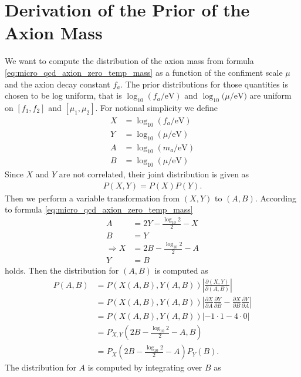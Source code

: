 \documentclass[twoside,a4paper, 12pt]{article}
\numberwithin{equation}{section}
\begin{document}
\section{Derivation of the Prior of the Axion Mass}
\label{sec:axion_mass_prior}
We want to compute the distribution of the axion mass from
formula \eqref{eq:micro_qcd_axion_zero_temp_mass} as a 
function of the confiment scale $\mu$ and the axion decay constant
$f_a$.
The prior distributions for those quantities is chosen
to be log uniform, that is $\log_{10} (f_a / \mathrm{eV})$
and $\log_{10} (\mu / \mathrm{eV)}$ are uniform on
$[f_1, f_2]$ and $[\mu_1, \mu_2]$.
For notional simplicity we define
\begin{align*}
    X &= \log_{10} (f_a / \mathrm{eV}) \\
    Y &= \log_{10} (\mu / \mathrm{eV}) \\
    A &= \log_{10} (m_a / \mathrm{eV}) \\
    B &= \log_{10} (\mu / \mathrm{eV})
\end{align*}
Since $X$ and $Y$ are not correlated, their joint distribution is
given as
\begin{align*}
    P(X, Y) = P(X) P(Y).
\end{align*}
Then we perform a variable transformation from $(X, Y)$
to $(A, B)$. According to formula \eqref{eq:micro_qcd_axion_zero_temp_mass} 
\begin{align*}
   A &= 2 Y - \frac{\log_{10} 2}{2} - X \\
   B &= Y \\
   \Rightarrow
   X &= 2 B - \frac{\log_{10} 2}{2} - A \\
   Y &= B
\end{align*}
holds.
Then the distribution for $(A, B)$ is computed as
\begin{align*}
    P(A, B) &= P(X(A, B), Y(A, B)) \left| \frac{\partial (X, Y)}{\partial (A, B)}\right| \\
            &= P(X(A, B), Y(A, B)) \left| \frac{\partial X}{\partial A} \frac{\partial Y}{\partial B} - 
                                          \frac{\partial X}{\partial B} \frac{\partial Y}{\partial A}\right| \\
            &= P(X(A, B), Y(A, B)) |-1 \cdot 1 - 4 \cdot 0| \\
            &= P_{X,Y}(2 B - \frac{\log_{10} 2}{2} - A, B) \\
            &= P_X(2 B - \frac{\log_{10} 2}{2} - A) P_{Y}(B).
\end{align*}
The distribution for $A$ is computed by integrating over $B$ as
\end{document}
